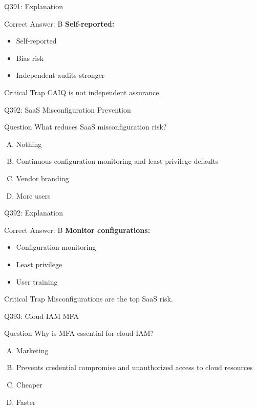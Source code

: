 \documentclass{beamer}
\begin{document}
	\begin{frame}{Q391: Explanation}
		\begin{block}{Correct Answer: B}
			\textbf{Self-reported:}
			\begin{itemize}
				\item Self-reported
				\item Bias risk
				\item Independent audits stronger
			\end{itemize}
		\end{block}
		\begin{alertblock}{Critical Trap}
			CAIQ is not independent assurance.
		\end{alertblock}
	\end{frame}
	
	\begin{frame}{Q392: SaaS Misconfiguration Prevention}
		\begin{block}{Question}
			What reduces SaaS misconfiguration risk?
		\end{block}
		\begin{enumerate}[(A)]
			\item Nothing
			\item Continuous configuration monitoring and least privilege defaults
			\item Vendor branding
			\item More users
		\end{enumerate}
	\end{frame}
	
	\begin{frame}{Q392: Explanation}
		\begin{block}{Correct Answer: B}
			\textbf{Monitor configurations:}
			\begin{itemize}
				\item Configuration monitoring
				\item Least privilege
				\item User training
			\end{itemize}
		\end{block}
		\begin{alertblock}{Critical Trap}
			Misconfigurations are the top SaaS risk.
		\end{alertblock}
	\end{frame}
	
	\begin{frame}{Q393: Cloud IAM MFA}
		\begin{block}{Question}
			Why is MFA essential for cloud IAM?
		\end{block}
		\begin{enumerate}[(A)]
			\item Marketing
			\item Prevents credential compromise and unauthorized access to cloud resources
			\item Cheaper
			\item Faster
		\end{enumerate}
	\end{frame}
	
\end{document}
